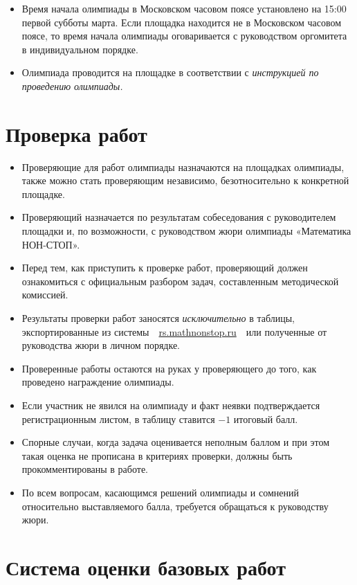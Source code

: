 \documentclass[a4paper,12pt]{article}
\newcommand{\mns}{«Математика НОН-СТОП»\xspace}
\begin{document}
\begin{itemize}
	\item Время начала олимпиады в Московском часовом поясе установлено на 15:00 первой субботы марта. Если площадка находится не в Московском часовом поясе, то время начала олимпиады оговаривается с руководством оргомитета в индивидуальном порядке.
	\item Олимпиада проводится на площадке в соответствии с {\it инструкцией по проведению олимпиады.}
\end{itemize}

\section{Проверка работ}

\begin{itemize}
	\item Проверяющие для работ олимпиады назначаются на площадках олимпиады, также можно стать проверяющим независимо, безотносительно к конкретной площадке.
	\item Проверяющий назначается по результатам собеседования с руководителем площадки и, по возможности, с руководством жюри олимпиады \mns.
	\item Перед тем, как приступить к проверке работ, проверяющий должен ознакомиться с официальным разбором задач, составленным методической комиссией.
	\item Результаты проверки работ заносятся {\it исключительно} в таблицы, экспортированные из системы\ \ \url{rs.mathnonstop.ru}\ \ или полученные от руководства жюри в личном порядке.
	\item Проверенные работы остаются на руках у проверяющего до того, как проведено награждение олимпиады.
	\item Если участник не явился на олимпиаду и факт неявки подтверждается регистрационным листом, в таблицу ставится $-1$ итоговый балл.
	\item Спорные случаи, когда задача оценивается неполным баллом и при этом такая оценка не прописана в критериях проверки, должны быть прокомментированы в работе.
	\item По всем вопросам, касающимся решений олимпиады и сомнений относительно выставляемого балла, требуется обращаться к руководству жюри.
\end{itemize}

\section{Система оценки базовых работ}
\end{document}
